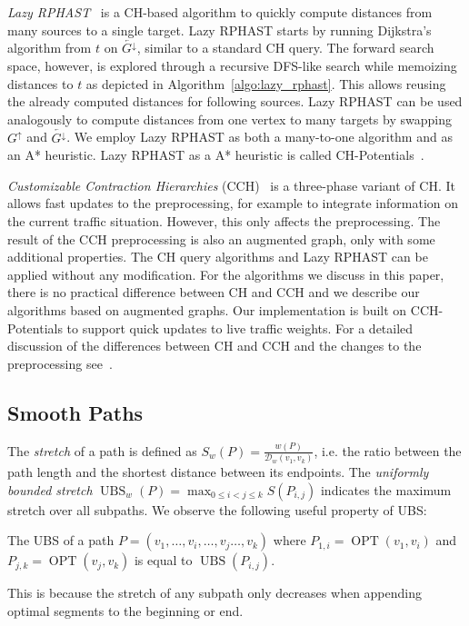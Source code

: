 \documentclass[a4paper,UKenglish,cleveref, autoref, thm-restate]{lipics-v2021}
\newcommand*{\dist}{\mathcal{D}}
\newcommand*{\shp}{\operatorname{OPT}}
\newcommand*{\ubs}{\operatorname{UBS}}
\newcommand*{\gchu}{G^{\uparrow}}
\newcommand*{\gchd}{\overleftarrow{G^{\downarrow}}}
\begin{document}
\emph{Lazy RPHAST}~\cite{strasser_et_al:LIPIcs.SEA.2021.6} is a CH-based algorithm to quickly compute distances from many sources to a single target.
Lazy RPHAST starts by running Dijkstra's algorithm from $t$ on $\gchd$, similar to a standard CH query.
The forward search space, however, is explored through a recursive DFS-like search while memoizing distances to $t$ as depicted in Algorithm~\ref{algo:lazy_rphast}.
This allows reusing the already computed distances for following sources.
Lazy RPHAST can be used analogously to compute distances from one vertex to many targets by swapping $\gchu$ and $\gchd$.
We employ Lazy RPHAST as both a many-to-one algorithm and as an A* heuristic.
Lazy RPHAST as a A* heuristic is called CH-Potentials~\cite{strasser_et_al:LIPIcs.SEA.2021.6}.

\emph{Customizable Contraction Hierarchies} (CCH)~\cite{dsw-cch-15} is a three-phase variant of CH.
It allows fast updates to the preprocessing, for example to integrate information on the current traffic situation.
However, this only affects the preprocessing.
The result of the CCH preprocessing is also an augmented graph, only with some additional properties.
The CH query algorithms and Lazy RPHAST can be applied without any modification.
For the algorithms we discuss in this paper, there is no practical difference between CH and CCH and we describe our algorithms based on augmented graphs.
Our implementation is built on CCH-Potentials to support quick updates to live traffic weights.
For a detailed discussion of the differences between CH and CCH and the changes to the preprocessing see~\cite{dsw-cch-15}.

\subsection{Smooth Paths}

The \emph{stretch} of a path is defined as $S_w(P) = \frac{w(P)}{\dist_w(v_1, v_k)}$, i.e. the ratio between the path length and the shortest distance between its endpoints.
The \emph{uniformly bounded stretch} $\ubs_w(P) = \max_{0 \leq i < j \leq k}S(P_{i,j})$ indicates the maximum stretch over all subpaths.
We observe the following useful property of UBS:
\begin{observation}\label{obs:append_sp_ubs}
The UBS of a path $P = (v_1, \dots, v_i, \dots, v_j \dots, v_k)$ where $P_{1,i} = \shp(v_1, v_i)$ and $P_{j,k} = \shp(v_j, v_k)$ is equal to $\ubs(P_{i,j})$.
\end{observation}
This is because the stretch of any subpath only decreases when appending optimal segments to the beginning or end.
\end{document}
